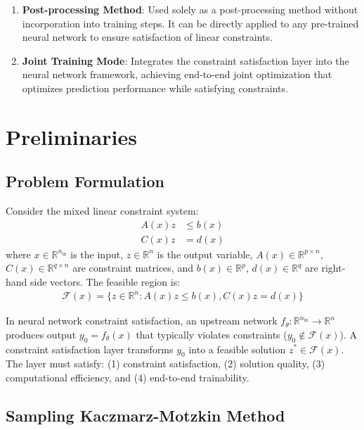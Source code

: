 \documentclass[letterpaper]{article} %
\begin{document}
\begin{enumerate}
\item \textbf{Post-processing Method}: Used solely as a post-processing method without incorporation into training steps. It can be directly applied to any pre-trained neural network to ensure satisfaction of linear constraints.
\item \textbf{Joint Training Mode}: Integrates the constraint satisfaction layer into the neural network framework, achieving end-to-end joint optimization that optimizes prediction performance while satisfying constraints.
\end{enumerate}

\section{Preliminaries}

\subsection{Problem Formulation}

Consider the mixed linear constraint system:
\begin{align}
A(x)z &\leq b(x) \\
C(x)z &= d(x)
\end{align}
where $x \in \mathbb{R}^{n_{\text{in}}}$ is the input, $z \in \mathbb{R}^{n}$ is the output variable, $A(x) \in \mathbb{R}^{p\times n}$, $C(x) \in \mathbb{R}^{q\times n}$ are constraint matrices, and $b(x) \in \mathbb{R}^p$, $d(x) \in \mathbb{R}^q$ are right-hand side vectors. The feasible region is:
\begin{align}
\mathcal{F}(x) = \{z \in \mathbb{R}^n: A(x)z\leq b(x), C(x)z=d(x) \}
\end{align}

In neural network constraint satisfaction, an upstream network $f_{\theta}: \mathbb{R}^{n_{\text{in}}} \to \mathbb{R}^n$ produces output $y_{0}=f_{\theta}(x)$ that typically violates constraints ($y_{0} \notin \mathcal{F}(x)$). A constraint satisfaction layer transforms $y_{0}$ into a feasible solution $z^* \in \mathcal{F}(x)$. The layer must satisfy: (1) constraint satisfaction, (2) solution quality, (3) computational efficiency, and (4) end-to-end trainability.

\subsection{Sampling Kaczmarz-Motzkin Method}
\end{document}
